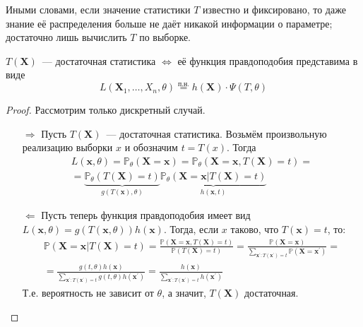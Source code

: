 Иными словами, если значение статистики $T$ известно и фиксировано, то даже знание её распределения больше не даёт никакой информации о параметре; достаточно лишь вычислить $T$ по выборке.

\begin{namedthm}
$T(\mathbf{X})$~--- достаточная статистика $\Leftrightarrow$ её функция правдоподобия представима в виде 
\begin{equation*}
    L(\mathbf{X}_{1}, \ldots, X_{n} , \theta) \stackrel{\text{п.н.}}{=} h(\mathbf{X}) \cdot \Psi(T, \theta)
\end{equation*}
\end{namedthm}

\begin{proof}
Рассмотрим только дискретный случай. 
\begin{enumerate}
    \item[$\Rightarrow$] Пусть $T(\mathbf{X})$~--- достаточная статистика. %
    Возьмём произвольную реализацию выборки $x$ и обозначим $t = T(x)$. Тогда
    \begin{multline*}
        L(\mathbf{x}, \theta) = \mathbb{P}_{\theta}(\mathbf{X}=\mathbf{x})=\mathbb{P}_{\theta}(\mathbf{X}=\mathbf{x}, T(\mathbf{X})=t) =\\
        = \underbrace{\mathbb{P}_{\theta}(T(\mathbf{X})=t)}_{g(T(\mathbf{x}), \theta)} \underbrace{\mathbb{P}_{\theta}(\mathbf{X}=\mathbf{x} | T(\mathbf{X})=t)}_{h(\mathbf{x}, t)}
    \end{multline*}
    \item[$\Leftarrow$] Пусть теперь функция правдоподобия имеет вид $L(\mathbf{x}, \theta)=g(T(\mathbf{x}, \theta)) h(\mathbf{x})$. Тогда, если $x$ таково, что $T(\mathbf{x})=t$, то:
    \begin{multline*}
        \mathbb{P}(\mathbf{X}=\mathbf{x} | T(\mathbf{X})=t) =\frac{\mathbb{P}(\mathbf{X}=\mathbf{x}, T(\mathbf{X})=t)}{\mathbb{P}(T(\mathbf{X})=t)}
        =\frac{\mathbb{P}(\mathbf{X}=\mathbf{x})}{\sum\limits_{\mathbf{x}^{\prime}: T(\mathbf{x}^{\prime})=t} \mathbb{P}(\mathbf{X}=\mathbf{x}^{\prime})} = \\
        = \frac{g(t, \theta) h(\mathbf{x})}{\sum\limits_{\mathbf{x}^{\prime}: T(\mathbf{x}^{\prime})=t} g(t, \theta) h(\mathbf{x}^{\prime})}
        = \frac{h(\mathbf{x})}{\sum\limits_{\mathbf{x}^{\prime}: T(\mathbf{x}^{\prime})=t} h(\mathbf{x}^{\prime})}
    \end{multline*}
    Т.е. вероятность не зависит от $\theta$, а значит, $T(\mathbf{X})$ достаточная.
\end{enumerate}
\end{proof}

